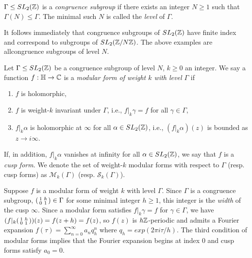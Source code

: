 \begin{defn}
$\Gamma \leq SL_2(\mathbb{Z})$ is a \textit{congruence subgroup} if there exists an integer $N \geq 1$ such that $\Gamma(N) \leq \Gamma$. The minimal such $N$ is called the \textit{level} of $\Gamma$.

It follows immediately that congruence subgroups of $SL_2(\mathbb{Z})$ have finite index and correspond to subgroups of $SL_2(\mathbb{Z}/N\mathbb{Z})$. The above examples are allcongruence subgroups of level $N$.
\end{defn}

\begin{defn}
    Let $\Gamma \leq SL_2(\mathbb{Z})$ be a congruence subgroup of level $N$, $k \geq 0$ an integer. We say a function $f: \mathbb{H} \rightarrow \mathbb{C}$ is a \textit{modular form of weight $k$ with level $\Gamma$} if

    \begin{enumerate}
        \item $f$ is holomorphic,
        \item $f$ is weight-$k$ invariant under $\Gamma$, i.e., $f|_k\gamma = f$ for all $\gamma \in \Gamma$,
        \item $f|_k\alpha $ is holomorphic at $\infty$ for all $\alpha \in SL_2(\mathbb{Z})$, i.e., $(f|_k \alpha )(z)$ is bounded as $z \rightarrow i\infty$.
    \end{enumerate}

    If, in addition, $f|_k \alpha$ vanishes at infinity for all $\alpha \in SL_2(\mathbb{Z})$, we say that $f$ is a \textit{cusp form}. We denote the set of weight-$k$ modular forms with respect to $\Gamma$ (resp. cusp forms) as $\mathcal{M}_k(\Gamma)$ (resp. $\mathcal{S}_k(\Gamma)$).
\end{defn}

Suppose $f$ is a modular form of weight $k$ with level $\Gamma$. Since $\Gamma$ is a congruence subgroup, $\begin{psmallmatrix}
    1 & h \\ 0 & 1
\end{psmallmatrix} \in \Gamma$ for some minimal integer $h\geq 1$, this integer is the \textit{width} of the cusp $\infty$. Since a modular form satisfies $f|_k \gamma = f$ for $\gamma \in \Gamma$, we have $(f|_k \begin{psmallmatrix}
    1 & h \\ 0 & 1
\end{psmallmatrix})(z) = f(z+h) = f(z) $, so $f(z)$ is $h\mathbb{Z}$-periodic and admits a Fourier expansion $f(\tau) = \sum_{n=0}^\infty a_n q_{h}^n$ where $q_h = exp(2\pi i\tau / h)$. The third condition of modular forms implies that the Fourier expansion begins at index $0$ and cusp forms satisfy $a_0 = 0$.

